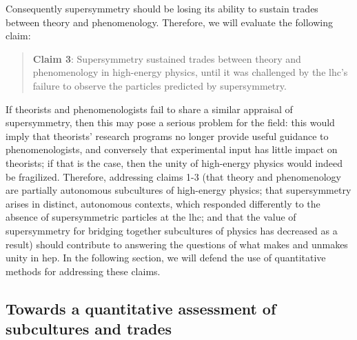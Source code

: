 \documentclass[smallextended]{svjour3}
\begin{document}
Consequently supersymmetry should be losing its ability to sustain trades between theory and phenomenology. Therefore, we will evaluate the following claim:
 
\begin{quote}
    \textbf{Claim 3}: Supersymmetry sustained trades between theory and phenomenology in high-energy physics, until it was challenged by the \gls{lhc}'s failure to observe the particles predicted by supersymmetry.
\end{quote}

If theorists and phenomenologists fail to share a similar appraisal of supersymmetry, then this may pose a serious problem for the field: this would imply that theorists' research programs no longer provide useful guidance to phenomenologists, and conversely that experimental input has little impact on theorists; if that is the case, then the unity of high-energy physics would indeed be fragilized. Therefore, addressing  claims 1-3 (that theory and phenomenology are partially autonomous subcultures of high-energy physics; that supersymmetry arises in distinct, autonomous contexts, which responded differently to the absence of supersymmetric particles at the \gls{lhc}; and that the value of supersymmetry for bridging together subcultures of physics has decreased as a result) should contribute to answering the questions of what makes and unmakes unity in \gls{hep}. In the following section, we will defend the use of quantitative methods for addressing these claims.%

\subsection{Towards a quantitative assessment of subcultures and trades}
\label{section:quantitative}
\end{document}
